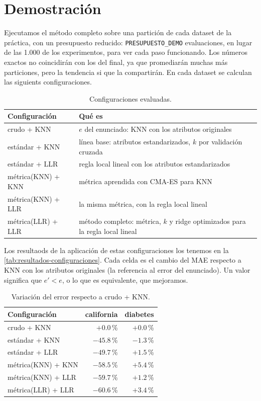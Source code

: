 \section{Demostración}
Ejecutamos el método completo sobre una partición de cada dataset de la práctica, con un presupuesto reducido: \texttt{PRESUPUESTO\_DEMO} evaluaciones, en lugar de las 1.000 de los experimentos, para ver cada paso funcionando. Los números exactos no coincidirán con los del final, ya que promediarán muchas más particiones, pero la tendencia si que la compartirán. En cada dataset se calculan las siguients configuraciones. 

\begin{table}[h]
\centering
\begin{tabular}{ll}
\hline
\textbf{Configuración} & \textbf{Qué es} \\
\hline
crudo + KNN & $e$ del enunciado: KNN con los atributos originales \\
estándar + KNN & línea base: atributos estandarizados, $k$ por validación cruzada \\
estándar + LLR & regla local lineal con los atributos estandarizados \\
métrica(KNN) + KNN & métrica aprendida con CMA-ES para KNN \\
métrica(KNN) + LLR & la misma métrica, con la regla local lineal \\
métrica(LLR) + LLR & método completo: métrica, $k$ y ridge optimizados para la regla local lineal \\
\hline
\end{tabular}
\caption{Configuraciones evaluadas.}
\label{tab:configuraciones}
\end{table}

Los resultaods de la aplicación de estas configuraciones los tenemos en la \autoref{tab:resultados-configuraciones}. Cada celda es el cambio del MAE respecto a KNN con los atributos originales (la referencia al error del enunciado). Un valor significa que $e'<e$, o lo que es equivalente, que mejoramos. 

\begin{table}[h]
\centering
\begin{tabular}{lrr}
\hline
\textbf{Configuración} & \textbf{california} & \textbf{diabetes} \\
\hline
crudo + KNN        & $+0.0$\,\%  & $+0.0$\,\% \\
estándar + KNN     & $-45.8$\,\% & $-1.3$\,\% \\
estándar + LLR     & $-49.7$\,\% & $+1.5$\,\% \\
métrica(KNN) + KNN & $-58.5$\,\% & $+5.4$\,\% \\
métrica(KNN) + LLR & $-59.7$\,\% & $+1.2$\,\% \\
métrica(LLR) + LLR & $-60.6$\,\% & $+3.4$\,\% \\
\hline
\end{tabular}
\caption{Variación del error respecto a crudo + KNN.}
\label{tab:resultados-configuraciones}
\end{table}

